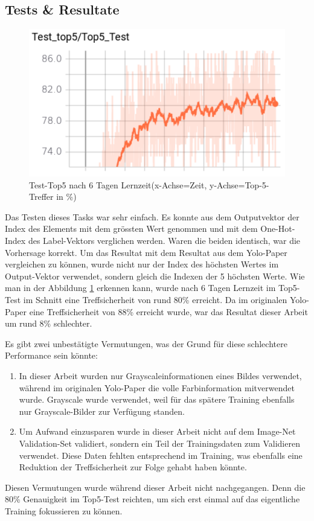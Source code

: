 \subsection{Tests \& Resultate}
\begin{figure}	
	\centering
	\includegraphics[width=.7\textwidth]{Kapitel/20Pretraining/Bilder/Test_top5.pdf}
	\caption{Test-Top5 nach 6 Tagen Lernzeit(x-Achse=Zeit, y-Achse=Top-5-Treffer in \%)}
	\label{img:test_top5}
\end{figure}   
Das Testen dieses Tasks war sehr einfach.
Es konnte aus dem Outputvektor der Index des Elements mit dem grössten Wert genommen und mit dem One-Hot-Index des Label-Vektors verglichen werden. 
Waren die beiden identisch, war die Vorhersage korrekt. 
Um das Resultat mit dem Resultat aus dem Yolo-Paper \cite{yolo} vergleichen zu können, wurde nicht nur der Index des höchsten Wertes im Output-Vektor verwendet, sondern gleich die Indexen der 5 höchsten Werte. 
Wie man in der Abbildung \ref{img:test_top5} erkennen kann, wurde nach 6 Tagen Lernzeit im Top5-Test im Schnitt eine Treffsicherheit von rund 80\% erreicht.
Da im originalen Yolo-Paper \cite{yolo} eine Treffsicherheit von 88\% erreicht wurde, war das Resultat dieser Arbeit um rund 8\% schlechter.

Es gibt zwei unbestätigte Vermutungen, was der Grund für diese schlechtere Performance sein könnte: 
\begin{enumerate}
\item In dieser Arbeit wurden nur Grayscaleinformationen eines Bildes verwendet, während im originalen Yolo-Paper \cite{yolo} die volle Farbinformation mitverwendet wurde. 
Grayscale wurde verwendet, weil für das spätere Training ebenfalls nur Grayscale-Bilder zur Verfügung standen.
\item Um Aufwand einzusparen wurde in dieser Arbeit nicht auf dem Image-Net Validation-Set validiert, sondern ein Teil der Trainingsdaten zum Validieren verwendet. Diese Daten fehlten entsprechend im Training, was ebenfalls eine Reduktion der Treffsicherheit zur Folge gehabt haben könnte. 
\end{enumerate}
Diesen Vermutungen wurde während dieser Arbeit nicht nachgegangen.
Denn die 80\% Genauigkeit im Top5-Test reichten, um sich erst einmal auf das eigentliche Training fokussieren zu können. 



